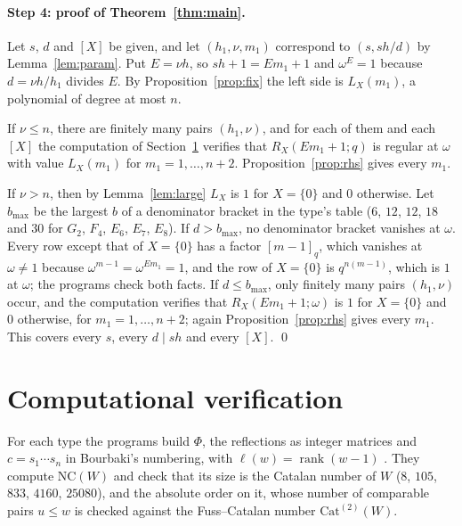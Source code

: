 \documentclass[11pt]{article}
\theoremstyle{definition}
\newcommand{\NC}{\mathrm{NC}}
\begin{document}
\paragraph{Step 4: proof of Theorem~\ref{thm:main}.}
Let $s$, $d$ and $[X]$ be given, and let $(h_1,\nu,m_1)$ correspond to
$(s,sh/d)$ by Lemma~\ref{lem:param}. Put $E=\nu h$, so $sh+1=Em_1+1$ and
$\omega^E=1$ because $d=\nu h/h_1$ divides $E$. By
Proposition~\ref{prop:fix} the left side is $L_X(m_1)$, a polynomial of
degree at most $n$.

If $\nu\le n$, there are finitely many pairs $(h_1,\nu)$, and for each of
them and each $[X]$ the computation of Section~\ref{sec:comp} verifies that
$R_X(Em_1+1;q)$ is regular at $\omega$ with value $L_X(m_1)$ for
$m_1=1,\dots,n+2$. Proposition~\ref{prop:rhs} gives every $m_1$.

If $\nu>n$, then by Lemma~\ref{lem:large} $L_X$ is $1$ for $X=\{0\}$ and $0$
otherwise. Let $b_{\max}$ be
the largest $b$ of a denominator bracket in the type's table ($6$, $12$, $12$,
$18$ and $30$ for $G_2$, $F_4$, $E_6$, $E_7$, $E_8$). If $d>b_{\max}$, no
denominator bracket vanishes at $\omega$. Every row except that of
$X=\{0\}$ has a factor $[m-1]_q$, which vanishes at $\omega\ne1$ because
$\omega^{m-1}=\omega^{Em_1}=1$, and the row of $X=\{0\}$ is $q^{n(m-1)}$,
which is $1$ at $\omega$; the programs check both facts. If $d\le b_{\max}$,
only finitely many pairs $(h_1,\nu)$ occur, and the computation verifies
that $R_X(Em_1+1;\omega)$ is $1$ for $X=\{0\}$ and $0$ otherwise, for
$m_1=1,\dots,n+2$; again
Proposition~\ref{prop:rhs} gives every $m_1$. This covers every $s$, every
$d\mid sh$ and every $[X]$. \qed

\section{Computational verification}\label{sec:comp}

For each type the programs build $\Phi$, the reflections as integer
matrices and $c=s_1\cdots s_n$ in Bourbaki's numbering, with
$\ell(w)=\operatorname{rank}(w-1)$ \cite[Lemma~2]{Car}. They compute
$\NC(W)$ and check that its size is the Catalan number of $W$ ($8$, $105$,
$833$, $4160$, $25080$), and the absolute order on it, whose number of
comparable pairs $u\le w$ is checked against the Fuss--Catalan number
$\mathrm{Cat}^{(2)}(W)$.
\end{document}
